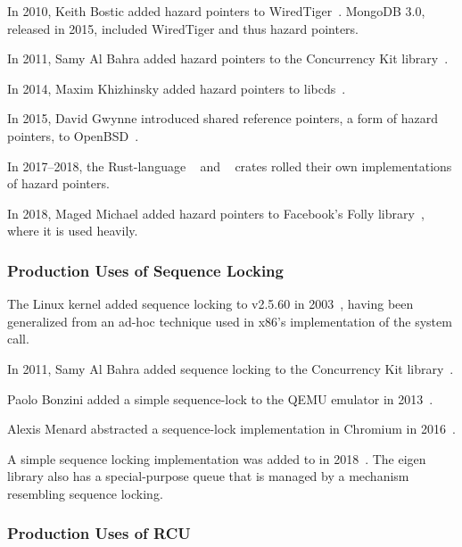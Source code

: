 In 2010, Keith Bostic added hazard pointers to
WiredTiger~\cite{KeithBostic2010WiredTigerhazptr}.
MongoDB 3.0, released in 2015, included WiredTiger and thus hazard pointers.

In 2011, Samy Al Bahra added hazard pointers to the Concurrency Kit
library~\cite{SamyAlBahra2011ckhp}.

In 2014, Maxim Khizhinsky added hazard pointers to
libcds~\cite{MaximKhizhinsky2014libcdsHazptr}.

In 2015, David Gwynne introduced shared reference pointers, a form
of hazard pointers, to OpenBSD~\cite{DavidGwynne2015srp}.

In 2017--2018, the Rust-language
~\cite{MichalVaner2018arc-swapHazptr} and
~\cite{crates.io.user.ticki2017concHazptr}
crates rolled their own implementations of hazard pointers.

In 2018, Maged Michael added hazard pointers to Facebook's Folly
library~\cite{MagedMichael2018FollyHazptr}, where it is used heavily.

\subsubsection{Production Uses of Sequence Locking}
\label{sec:defer:Production Uses of Sequence Locking}

The Linux kernel added sequence locking to v2.5.60 in
2003~\cite{JonathanCorbet2003seqlock}, having been generalized from
an ad-hoc technique used in x86's implementation of the
 system call.

In 2011, Samy Al Bahra added sequence locking to the Concurrency Kit
library~\cite{SamyAlBahra2011ckseqlock}.

Paolo Bonzini added a simple sequence-lock to the QEMU emulator in
2013~\cite{PaoloBonzini2013QEMUseqlock}.

Alexis Menard abstracted a sequence-lock implementation in Chromium
in 2016~\cite{AlexisMenard2016ChromiumSeqLock}.

A simple sequence locking implementation was added to 
in 2018~\cite{DavidGoldblatt2018seqlock}.
The eigen library also has a special-purpose queue that is managed by
a mechanism resembling sequence locking.

\subsubsection{Production Uses of RCU}
\label{sec:defer:Production Uses of RCU}

